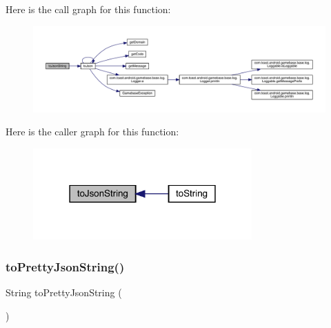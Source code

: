 Here is the call graph for this function\+:
\nopagebreak
\begin{figure}[H]
\begin{center}
\leavevmode
\includegraphics[width=350pt]{classcom_1_1toast_1_1android_1_1gamebase_1_1base_1_1_gamebase_exception_a58acf6402880e9769d79d8667581fa6a_cgraph}
\end{center}
\end{figure}
Here is the caller graph for this function\+:
\nopagebreak
\begin{figure}[H]
\begin{center}
\leavevmode
\includegraphics[width=238pt]{classcom_1_1toast_1_1android_1_1gamebase_1_1base_1_1_gamebase_exception_a58acf6402880e9769d79d8667581fa6a_icgraph}
\end{center}
\end{figure}
\mbox{\label{classcom_1_1toast_1_1android_1_1gamebase_1_1base_1_1_gamebase_exception_a054431f3d988a22295cfc8b784ff2637}} 
\subsubsection{\texorpdfstring{to\+Pretty\+Json\+String()}{toPrettyJsonString()}}
{\footnotesize\ttfamily String to\+Pretty\+Json\+String (\begin{DoxyParamCaption}{ }\end{DoxyParamCaption})}

